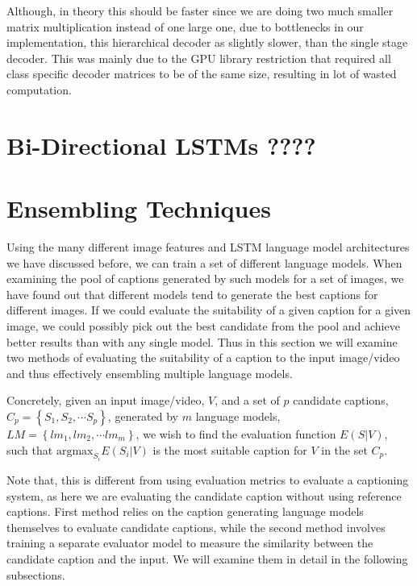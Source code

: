 Although, in theory this should be faster since we are doing two much smaller
matrix multiplication instead of one large one, due to bottlenecks in our
implementation, this hierarchical decoder as slightly slower, than the single
stage decoder.
This was mainly due to the GPU library restriction that required all class
specific decoder matrices to be of the same size, resulting in lot of wasted
computation.
\section{Bi-Directional LSTMs ????}
\section{Ensembling Techniques}
Using the many different image features and LSTM language model architectures we
have discussed before, we can train a set of different language models.
When examining the pool of captions generated by such models for a set of
images, we have found out that different models tend to generate the best
captions for different images.
If we could evaluate the suitability of a given caption for a given image, we
could possibly pick out the best candidate from the pool and achieve better
results than with any single model.
Thus in this section we will examine two methods of evaluating the suitability
of a caption to the input image/video and thus effectively ensembling multiple
language models.

Concretely, given an input image/video, $V$, and a set of $p$ candidate
captions, $C_p = \left\{S_1,S_2,\cdots S_p \right\}$, generated by $m$ language
models, $LM = \left\{lm_1,lm_2,\cdots lm_m \right\}$, we wish to find the
evaluation function $E(S|V)$, such that $\text{argmax}_{S_i} E(S_i|V)$ is the
most suitable caption for $V$ in the set $C_p$.

Note that, this is different from using evaluation metrics to evaluate a
captioning system, as here we are evaluating the candidate caption without using
reference captions.
First method relies on the caption generating language models themselves to
evaluate candidate captions, while the second method involves training a
separate evaluator model to measure the similarity between the candidate caption
and the input.
We will examine them in detail in the following subsections.

